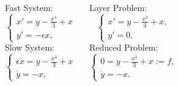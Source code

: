 \documentclass[25pt, a0paper, portrait]{tikzposter}
\begin{document}
\begin{columns}
{Fast System:
\begin{equation*}\label{fastsystem}
    \begin{cases} x'=y-\frac{x^3}{3}+x\\
    y'=-\epsilon x,
    \end{cases}
\end{equation*}
Slow System: 
\begin{equation*}\label{slowsystem}
    \begin{cases} \epsilon \dot{x}=y-\frac{x^3}{3}+x\\
    \dot{y}=-x,
    \end{cases}
\end{equation*}
}
{
Layer Problem:
\begin{equation*}\label{fastsystem0}
    \begin{cases} x'=y-\frac{x^3}{3}+x,\\
    y'=0,
    \end{cases}
\end{equation*}
Reduced Problem:
\begin{equation*}\label{slowsystem0}
    \begin{cases} 0=y-\frac{x^3}{3}+x:=f,\\
    \dot{y}=-x.
    \end{cases}
\end{equation*}

}
 

\end{columns}
\end{document}
